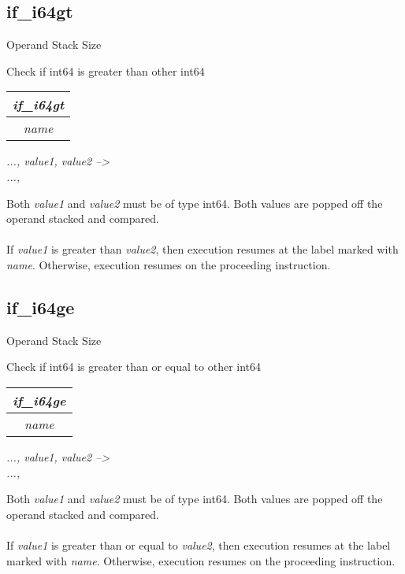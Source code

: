 \documentclass[12pt]{article}
\begin{document}
		\subsection*{if\_i64gt}
			\begin{labeling}{Operand Stack Size}
				\item [\textbf{Operation}] Check if int64 is greater than other int64
				\item [\textbf{Format}] \begin{tabular}{| c |} \hline \textit{if\_i64gt} \\ \hline \textit{name} \\ \hline \end{tabular}
				\item [\textbf{Operand Stack}] \textit{..., value1, value2 --\textgreater} \\
										\textit{..., }
				\item [\textbf{Description}] Both \textit{value1} and \textit{value2} must be of type int64. Both values are popped off the operand stacked and compared. \\ \\
				If \textit{value1} is greater than \textit{value2}, then execution resumes at the label marked with \textit{name}. Otherwise, execution resumes on the proceeding instruction. 
			\end{labeling}	
		\newpage
		
		\subsection*{if\_i64ge}
			\begin{labeling}{Operand Stack Size}
				\item [\textbf{Operation}] Check if int64 is greater than or equal to other int64
				\item [\textbf{Format}] \begin{tabular}{| c |} \hline \textit{if\_i64ge} \\ \hline \textit{name} \\ \hline \end{tabular}
				\item [\textbf{Operand Stack}] \textit{..., value1, value2 --\textgreater} \\
										\textit{..., }
				\item [\textbf{Description}] Both \textit{value1} and \textit{value2} must be of type int64. Both values are popped off the operand stacked and compared. \\ \\
				If \textit{value1} is greater than or equal to \textit{value2}, then execution resumes at the label marked with \textit{name}. Otherwise, execution resumes on the proceeding instruction. 
			\end{labeling}	
		\newpage
\end{document}

